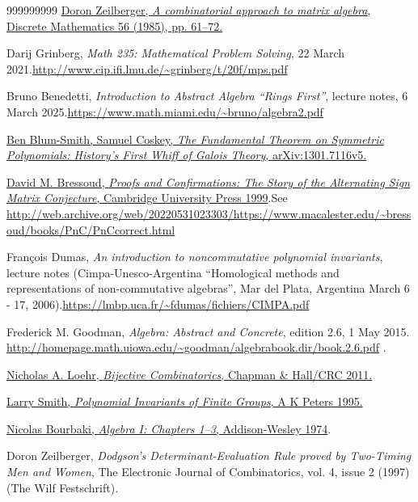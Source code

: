 \begin{thebibliography}{999999999}
\href{http://www.math.rutgers.edu/~zeilberg/mamarimY/DM85.pdf}{Doron
Zeilberger, \textit{A combinatorial approach to matrix algebra}, Discrete
Mathematics 56 (1985), pp. 61--72.}

Darij Grinberg, \textit{Math 235: Mathematical Problem
Solving}, 22 March 2021.\newline\url{http://www.cip.ifi.lmu.de/~grinberg/t/20f/mps.pdf}

Bruno Benedetti, \textit{Introduction to Abstract
Algebra \textquotedblleft Rings First\textquotedblright}, lecture notes, 6
March 2025.\newline\url{https://www.math.miami.edu/~bruno/algebra2.pdf}

\href{https://arxiv.org/abs/1301.7116v5}{Ben
Blum-Smith, Samuel Coskey, \textit{The Fundamental Theorem on Symmetric
Polynomials: History's First Whiff of Galois Theory}, arXiv:1301.7116v5.}

%
\href{https://doi.org/10.1017/CBO9780511613449}{David M. Bressoud,
\textit{Proofs and Confirmations: The Story of the Alternating Sign Matrix
Conjecture}, Cambridge University Press 1999}.\newline See
\url{http://web.archive.org/web/20220531023303/https://www.macalester.edu/~bressoud/books/PnC/PnCcorrect.html}

Fran\c{c}ois Dumas, \textit{An introduction to
noncommutative polynomial invariants}, lecture notes (Cimpa-Unesco-Argentina
\textquotedblleft Homological methods and representations of non-commutative
algebras\textquotedblright, Mar del Plata, Argentina March 6 - 17,
2006).\newline\url{https://lmbp.uca.fr/~fdumas/fichiers/CIMPA.pdf}

Frederick M. Goodman, \textit{Algebra: Abstract and
Concrete}, edition 2.6, 1 May 2015.\newline%
\url{http://homepage.math.uiowa.edu/~goodman/algebrabook.dir/book.2.6.pdf} .

%
\href{http://www.math.vt.edu/people/nloehr/bijbook.html}{Nicholas A. Loehr,
\textit{Bijective Combinatorics}, Chapman \& Hall/CRC 2011.}

\href{https://doi.org/10.1201/9781439864470}{Larry
Smith, \textit{Polynomial Invariants of Finite Groups}, A K Peters 1995.}

%
\href{http://libgen.rs/book/index.php?md5=3270565F6D0052635A1550883588204C}{Nicolas
Bourbaki, \textit{Algebra I: Chapters 1--3}, Addison-Wesley 1974}.

Doron Zeilberger, \textit{Dodgson's
Determinant-Evaluation Rule proved by Two-Timing Men and Women}, The
Electronic Journal of Combinatorics, vol. 4, issue 2 (1997) (The Wilf
Festschrift).

\end{thebibliography}
